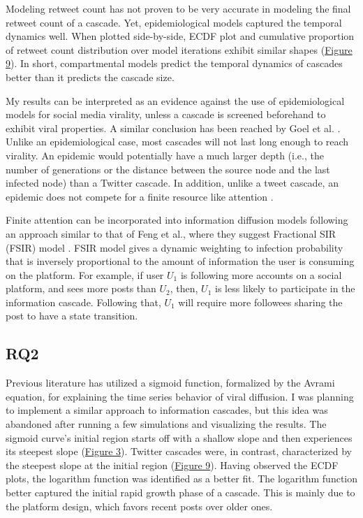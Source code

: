 \documentclass[11pt,a4paper]{article}
\begin{document}
    Modeling retweet count has not proven to be very accurate in modeling the final retweet count of a cascade. Yet, epidemiological models captured the temporal dynamics well. When plotted side-by-side, ECDF plot and cumulative proportion of retweet count distribution over model iterations exhibit similar shapes (\hyperlink{fig:ecdf-vs-iter}{Figure 9}). In short, compartmental models predict the temporal dynamics of cascades better than it predicts the cascade size.

    My results can be interpreted as an evidence against the use of epidemiological models for social media virality, unless a cascade is screened beforehand to exhibit viral properties. A similar conclusion has been reached by Goel et al. \cite{goel_note_2015}. Unlike an epidemiological case, most cascades will not last long enough to reach virality. An epidemic would potentially have a much larger depth (i.e., the number of generations or the distance between the source node and the last infected node) than a Twitter cascade. In addition, unlike a tweet cascade, an epidemic does not compete for a finite resource like attention \cite{lorenz-spreen_accelerating_2019,feng_competing_2015}. 

    Finite attention can be incorporated into information diffusion models following an approach similar to that of Feng et al., where they suggest Fractional SIR (FSIR) model \cite{feng_competing_2015}. FSIR model gives a dynamic weighting to infection probability that is inversely proportional to the amount of information the user is consuming on the platform. For example, if user $U_1$ is following more accounts on a social platform, and sees more posts than $U_2$, then, $U_1$ is less likely to participate in the information cascade. Following that, $U_1$ will require more followees sharing the post to have a state transition.
    
    \subsection{RQ2}
        Previous literature \cite{shirzad_critical_2023} has utilized a sigmoid function, formalized by the Avrami equation, for explaining the time series behavior of viral diffusion. I was planning to implement a similar approach to information cascades, but this idea was abandoned after running a few simulations and visualizing the results. The sigmoid curve's initial region starts off with a shallow slope and then experiences its steepest slope (\hyperlink{fig:sigmoid}{Figure 3}). Twitter cascades were, in contrast, characterized by the steepest slope at the initial region (\hyperlink{fig:ecdf-vs-iter}{Figure 9}). Having observed the ECDF plots, the logarithm function was identified as a better fit. The logarithm function better captured the initial rapid growth phase of a cascade. This is mainly due to the platform design, which favors recent posts over older ones.
\end{document}
